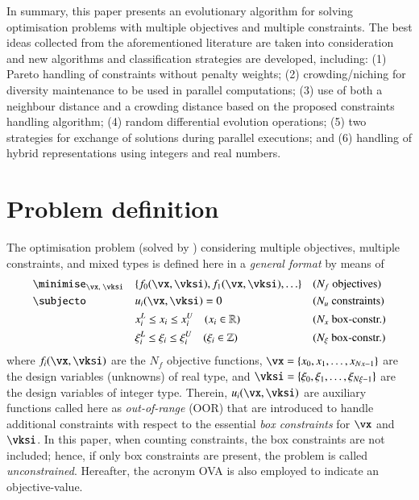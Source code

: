 \documentclass[final,5p,times,twocolumn]{elsarticle}
\begin{document}
In summary, this paper presents an evolutionary algorithm for solving optimisation problems with
multiple objectives and multiple constraints. The best ideas collected from the aforementioned
literature are taken into consideration and new algorithms and classification strategies are
developed, including: (1) Pareto handling of constraints without penalty weights; (2)
crowding/niching for diversity maintenance to be used in parallel computations; (3) use of both a
neighbour distance and a crowding distance based on the proposed constraints handling algorithm; (4)
random differential evolution operations; (5) two strategies for exchange of solutions during
parallel executions; and (6) handling of hybrid representations using integers and real numbers.



\section{Problem definition}

The optimisation problem (solved by \goga) considering multiple objectives, multiple constraints, 
and mixed types is defined here in a \emph{general format} by means of
\begin{equation}
\begin{aligned}
& \minimise_{\vx,\;\vksi} && \{f_0(\vx,\vksi), f_1(\vx,\vksi), \ldots\}                  && \text{($N_f$ objectives)} \\
& \subjecto               && u_i(\vx,\vksi) = 0                                          && \text{($N_u$ constraints)} \\
&                         && x_i^L   \leq x_i   \leq x_i^U   \quad(x_i \in \mathbb{R})   && \text{($N_x$ box-constr.)} \\
&                         && \xi_i^L \leq \xi_i \leq \xi_i^U \quad(\xi_i \in \mathbb{Z}) && \text{($N_\xi$ box-constr.)}
\end{aligned}
\label{eqn:optGeneral}
\end{equation}
where $f_i(\vx,\vksi)$ are the $N_f$ objective functions, ${\vx=\{x_0,x_1,\ldots,x_{Nx-1}\}}$ are
the design variables (unknowns) of real type, and ${\vksi=\{\xi_0,\xi_1,\ldots,\xi_{N\xi-1}\}}$ are
the design variables of integer type. Therein, $u_i(\vx,\vksi)$ are auxiliary functions called here
as \emph{out-of-range} (OOR) that are introduced to handle additional constraints with respect to
the essential \emph{box constraints} for $\vx$ and $\vksi$. In this paper, when counting constraints,
the box constraints are not included; hence, if only box constraints are present, the problem is
called \emph{unconstrained}. Hereafter, the acronym OVA is also employed to indicate an
objective-value.
\end{document}
